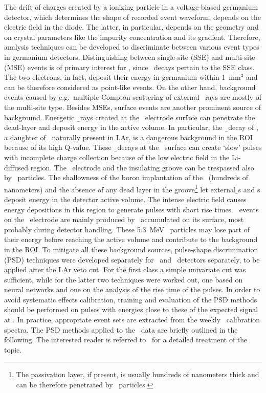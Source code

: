The drift of charges created by a ionizing particle in a voltage-biased germanium
detector, which determines the shape of recorded event waveform, depends on the electric
field in the diode. The latter, in particular, depends on the geometry and on crystal
parameters like the impurity concentration and its gradient. Therefore, analysis
techniques can be developed to discriminate between various event types in germanium
detectors. Distinguishing between single-site (SSE) and multi-site (MSE) events is of
primary interest for \gerda, since \onbb\ decays pertain to the SSE class. The two
electrons, in fact, deposit their energy in germanium within 1~mm$^3$ and can be therefore
considered as point-like events. On the other hand, background events caused by
e.g.~multiple Compton scattering of external \g\ rays are mostly of the multi-site type.
Besides MSEs, surface events are another prominent source of background. Energetic \b\
rays created at the \nplus\ electrode surface can penetrate the dead-layer and deposit
energy in the active volume. In particular, the \b\ decay of \kvz, a daughter of \Arh\
naturally present in LAr, is a dangerous background in the ROI because of its high
Q-value. These \b\ decays at the \nplus\ surface can create `slow' pulses with incomplete
charge collection because of the low electric field in the Li-diffused region. The \pplus\
electrode and the insulating groove can be trespassed also by \a\ particles. The
shallowness of the boron implantation of the \pplus\ (hundreds of nanometers) and the
absence of any dead layer in the groove\footnote{The passivation layer, if present, is
usually hundreds of nanometers thick and can be therefore penetrated by \a\ particles.}
let external \b{}s and \a{}s deposit energy in the detector active volume. The intense
electric field causes energy depositions in this region to generate pulses with short
rise times. \a\ events on the \pplus\ electrode are mainly produced by \Po\ accumulated
on its surface, most probably during detector handling. These 5.3~MeV \a\ particles may
lose part of their energy before reaching the active volume and contribute to the
background in the ROI.
\newpar
To mitigate all these background sources, pulse-shape discrimination (PSD) techniques were
developed separately for \bege\ and \scoax\ detectors separately, to be applied after the
LAr veto cut. For the first class a simple univariate cut was sufficient, while for the
latter two techniques were worked out, one based on neural networks and one on the
analysis of the rise time of the pulses.  In order to avoid systematic effects
calibration, training and evaluation of the PSD methods should be performed on pulses with
energies close to these of the expected signal at \qbb.  In practice, appropriate event
sets are extracted from the weekly \Th\ calibration spectra. The PSD methods applied to
the \gerda\ data are briefly outlined in the following. The interested reader is referred
to~\cite{psd-paper} for a detailed treatment of the topic. \fillme{define somewhere FEP,
SEP and DEP}

